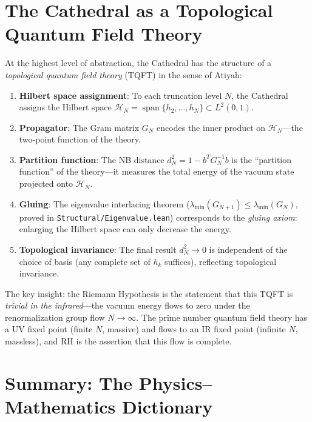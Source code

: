 \documentclass[11pt,a4paper]{article}
\theoremstyle{definition}
\newcommand{\HH}{\mathcal{H}}
\newcommand{\lean}[1]{\texttt{#1}}
\begin{document}
\section{The Cathedral as a Topological Quantum Field Theory}
\label{sec:tqft}

At the highest level of abstraction, the Cathedral has the structure
of a \emph{topological quantum field theory} (TQFT) in the sense
of Atiyah:

\begin{enumerate}
  \item \textbf{Hilbert space assignment}: To each truncation level $N$,
    the Cathedral assigns the Hilbert space
    $\HH_N = \operatorname{span}\{h_2, \ldots, h_N\} \subset L^2(0,1)$.

  \item \textbf{Propagator}: The Gram matrix $G_N$ encodes the inner
    product on $\HH_N$---the two-point function of the theory.

  \item \textbf{Partition function}: The NB distance $d_N^2 = 1 - b^T G_N^{-1} b$
    is the ``partition function'' of the theory---it measures the total
    energy of the vacuum state projected onto $\HH_N$.

  \item \textbf{Gluing}: The eigenvalue interlacing theorem
    ($\lambda_{\min}(G_{N+1}) \leq \lambda_{\min}(G_N)$, proved in
    \lean{Structural/Eigenvalue.lean}) corresponds to the \emph{gluing
    axiom}: enlarging the Hilbert space can only decrease the energy.

  \item \textbf{Topological invariance}: The final result $d_N^2 \to 0$
    is independent of the choice of basis (any complete set of $h_k$
    suffices), reflecting topological invariance.
\end{enumerate}

The key insight: the Riemann Hypothesis is the statement that this
TQFT is \emph{trivial in the infrared}---the vacuum energy flows to
zero under the renormalization group flow $N \to \infty$. The prime
number quantum field theory has a UV fixed point (finite $N$, massive)
and flows to an IR fixed point (infinite $N$, massless), and RH is the
assertion that this flow is complete.

\section{Summary: The Physics--Mathematics Dictionary}
\label{sec:summary}
\end{document}
